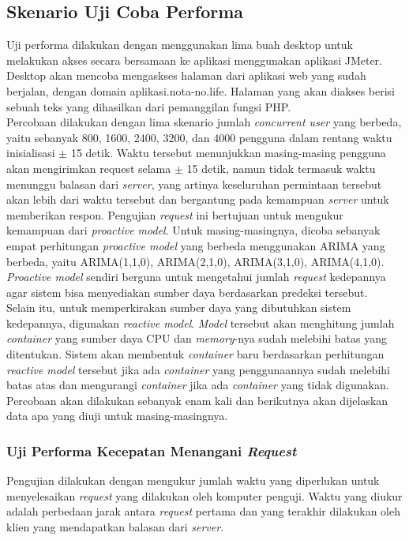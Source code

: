     \subsection{Skenario Uji Coba Performa}
    	Uji performa dilakukan dengan menggunakan lima buah desktop untuk melakukan akses secara bersamaan ke aplikasi menggunakan aplikasi JMeter. Desktop akan mencoba mengaskses halaman dari aplikasi web yang sudah berjalan, dengan domain aplikasi.nota-no.life. Halaman yang akan diakses berisi sebuah teks yang dihasilkan dari pemanggilan fungsi PHP. \\
        \indent Percobaan dilakukan dengan lima skenario jumlah \textit{concurrent user} yang berbeda, yaitu sebanyak 800, 1600, 2400, 3200, dan 4000 pengguna dalam rentang waktu inisialisasi $\pm$ 15 detik. Waktu tersebut menunjukkan masing-masing pengguna akan mengirimkan request selama $\pm$ 15 detik, namun tidak termasuk waktu menunggu balasan dari \textit{server}, yang artinya keseluruhan permintaan tersebut akan lebih dari waktu tersebut dan bergantung pada kemampuan \textit{server} untuk memberikan respon. Pengujian \textit{request} ini bertujuan untuk mengukur kemampuan dari \textit{proactive model}. Untuk masing-masingnya, dicoba sebanyak empat perhitungan \textit{proactive model} yang berbeda menggunakan ARIMA yang berbeda, yaitu ARIMA(1,1,0), ARIMA(2,1,0), ARIMA(3,1,0), ARIMA(4,1,0). \textit{Proactive model} sendiri berguna untuk mengetahui jumlah \textit{request} kedepannya agar sistem bisa menyediakan sumber daya berdasarkan predeksi tersebut. \\
        \indent Selain itu, untuk memperkirakan sumber daya yang dibutuhkan sistem kedepannya, digunakan \textit{reactive model}. \textit{Model} tersebut akan menghitung jumlah \textit{container} yang sumber daya CPU dan \textit{memory}-nya sudah melebihi batas yang ditentukan. Sistem akan membentuk \textit{container} baru berdasarkan perhitungan \textit{reactive model} tersebut jika ada \textit{container} yang penggunaannya sudah melebihi batas atas dan mengurangi \textit{container} jika ada \textit{container} yang tidak digunakan. Percobaan akan dilakukan sebanyak enam kali dan berikutnya akan dijelaskan data apa yang diuji untuk masing-masingnya. \\
        \indent
    	\subsubsection{Uji Performa Kecepatan Menangani \textit{Request}}
        	Pengujian dilakukan dengan mengukur jumlah waktu yang diperlukan untuk menyelesaikan \textit{request} yang dilakukan oleh komputer penguji. Waktu yang diukur adalah perbedaan jarak antara \textit{request} pertama dan yang terakhir dilakukan oleh klien yang mendapatkan balasan dari \textit{server}.
